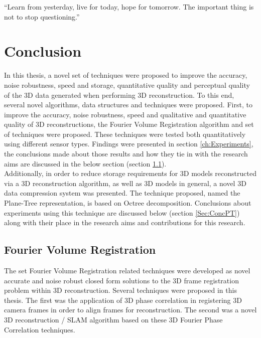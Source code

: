 \begin{savequote}[8cm]
  ``Learn from yesterday, live for today, hope for tomorrow. The important thing is not to stop questioning.''
\end{savequote}
\makeatletter
\chapter{Conclusion}
\label{ch:Conclusion}

In this thesis, a novel set of techniques were proposed to improve the accuracy, noise robustness, speed and storage, quantitative quality and perceptual quality of the 3D data generated when performing 3D reconstruction. To this end, several novel algorithms, data structures and techniques were proposed. First, to improve the accuracy, noise robustness, speed and qualitative and quantitative quality of 3D reconstructions, the Fourier Volume Registration algorithm and set of techniques were proposed. These techniques were tested both quantitatively using different sensor types. Findings were presented in section \ref{ch:Experiments}, the conclusions made about those results and how they tie in with the research aims are discussed in the below section (section \ref{Sec:ConcFVR}). \\

Additionally, in order to reduce storage requirements for 3D models reconstructed via a 3D reconstruction algorithm, as well as 3D models in general, a novel 3D data compression system was presented. The technique proposed, named the Plane-Tree representation, is based on Octree decomposition. Conclusions about experiments using this technique are discussed below (section \ref{Sec:ConcPT}) along with their place in the research aims and contributions for this research. \\

\section{Fourier Volume Registration}
\label{Sec:ConcFVR}

The set Fourier Volume Registration related techniques were developed as novel accurate and noise robust closed form solutions to the 3D frame registration problem within 3D reconstruction. Several techniques were proposed in this thesis. The first was the application of 3D phase correlation in registering 3D camera frames in order to align frames for reconstruction. The second was a novel 3D reconstruction / SLAM algorithm based on these 3D Fourier Phase Correlation techniques. \\

